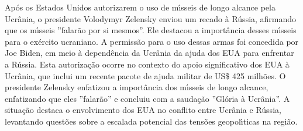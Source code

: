 \documentclass{article}%
\begin{document}
Ap\'os os Estados Unidos autorizarem o uso de m{\'\i}sseis de longo alcance pela Ucr\^ania, o presidente Volodymyr Zelensky enviou um recado \`a R\'ussia, afirmando que os m{\'\i}sseis ''falar\~ao por si mesmos''. Ele destacou a import\^ancia desses m{\'\i}sseis para o ex\'ercito ucraniano. A permiss\~ao para o uso dessas armas foi concedida por Joe Biden, em meio \`a depend\^encia da Ucr\^ania da ajuda dos EUA para enfrentar a R\'ussia. Esta autoriza\c{c}\~ao ocorre no contexto do apoio significativo dos EUA \`a Ucr\^ania, que inclui um recente pacote de ajuda militar de US\$ 425 milh\~oes. O presidente Zelensky enfatizou a import\^ancia dos m{\'\i}sseis de longo alcance, enfatizando que eles ''falar\~ao'' e concluiu com a sauda\c{c}\~ao ''Gl\'oria \`a Ucr\^ania''. A situa\c{c}\~ao destaca o envolvimento dos EUA no conflito entre Ucr\^ania e R\'ussia, levantando quest\~oes sobre a escalada potencial das tens\~oes geopol{\'\i}ticas na regi\~ao.

%
\end{document}
